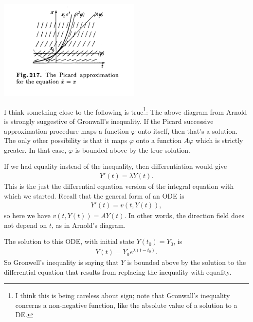 \begin{mdframed}
\includegraphics[width=200pt]{img/differential-equations-picard-gronwall.png}
\end{mdframed}

\begin{remark*}
  I think something close to the following is true\footnote{I think this is
    being careless about sign; note that Gronwall's inequality concerns a
    non-negative function, like the absolute value of a solution to a DE.}: The
  above diagram from Arnold is strongly suggestive of Gronwall's inequality. If
  the Picard successive approximation procedure maps a function $\varphi$ onto
  itself, then that's a solution. The only other possibility is that it maps
  $\varphi$ onto a function $A\varphi$ which is strictly greater. In that case,
  $\varphi$ is bounded above by the true solution.
\end{remark*}

\begin{remark*}
  If we had equality instead of the inequality, then differentiation would give
  \begin{align*}
    Y'(t) = \lambda Y(t).
  \end{align*}
  This is the just the differential equation version of the integral equation
  with which we started. Recall that the general form of an ODE is
  \begin{align*}
    Y'(t) = v(t, Y(t)),
  \end{align*}
  so here we have $v(t, Y(t)) = AY(t)$. In other words, the direction field
  does not depend on $t$, as in Arnold's diagram.

  The solution to this ODE, with initial state $Y(t_0) = Y_0$, is
  \begin{align*}
    Y(t) = Y_0e^{\lambda(t - t_0)}.
  \end{align*}
  So Gronwell's inequality is saying that $Y$ is bounded above by the solution
  to the differential equation that results from replacing the inequality with
  equality.
\end{remark*}

